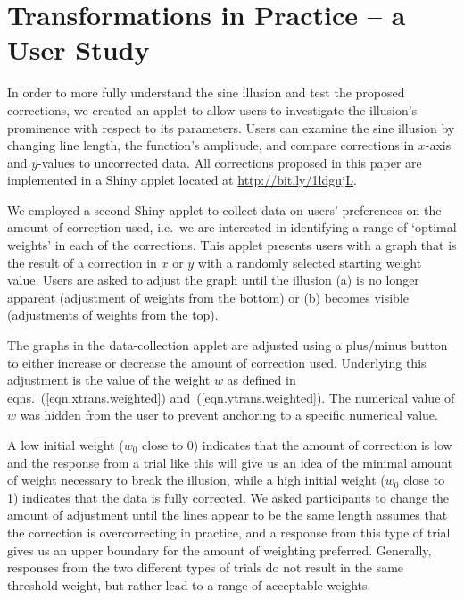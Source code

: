 \documentclass[12pt]{article}\usepackage[]{graphicx}\usepackage[]{color}
\begin{document}

\section{Transformations in Practice -- a User Study}

In order to more fully understand the sine illusion and test the proposed corrections, we created an applet to allow users to investigate the illusion's prominence with respect to its parameters. Users can examine the sine illusion by changing line length, the function's amplitude, and compare corrections in $x$-axis and $y$-values to uncorrected data.  All corrections proposed in this paper are implemented in a Shiny applet \citep{shiny} located at \url{http://bit.ly/1ldgujL}.

We employed a second Shiny applet to collect data on users' preferences on the amount of correction used, i.e.~we are interested in identifying a range of `optimal weights' in each of the corrections. This applet presents users with a graph that is the result of a correction in $x$ or $y$ with a randomly selected starting weight value. Users are asked to adjust the graph until the illusion  (a) is no longer apparent (adjustment of weights from the bottom) or (b) becomes visible (adjustments of weights from the top).

The graphs in the data-collection applet are adjusted using a plus/minus button to either increase or decrease the amount of correction used. Underlying this adjustment is the value of the weight $w$ as defined in eqns.~(\ref{eqn.xtrans.weighted}) and~(\ref{eqn.ytrans.weighted}). The numerical value of $w$ was hidden from the user to prevent anchoring to a specific numerical value.

A low  initial weight ($w_0$ close to 0) indicates that the amount of correction is low and the response from a trial like this will give us an idea of the minimal amount of weight necessary to break the illusion, while a high initial weight ($w_0$ close to 1) indicates that the data is fully corrected. We asked participants to change the amount of adjustment until the lines appear to be the same length assumes that the correction is overcorrecting in practice, and a response from this type of trial gives us an upper boundary for the amount of weighting preferred. Generally, responses from the two different types of trials do not result in the same threshold weight, but rather lead to a range of acceptable weights.
\end{document}
